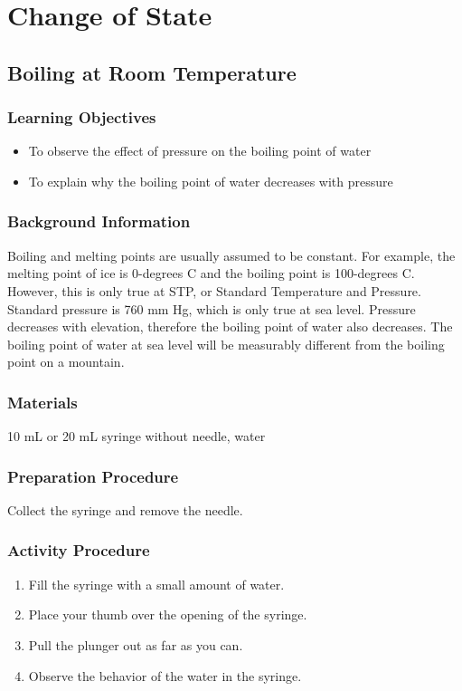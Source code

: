 \section{Change of State}

\subsection{Boiling at Room Temperature}

\subsubsection*{Learning Objectives}
\begin{itemize}
\item{To observe the effect of pressure on the boiling point of water} 
\item{To explain why the boiling point of water decreases with pressure} 
\end{itemize}

\subsubsection*{Background Information}
Boiling and melting points are usually assumed to be constant. For example, the melting point of ice is 0-degrees C and the boiling point is 100-degrees C. However, this is only true at STP, or Standard Temperature and Pressure. Standard pressure is 760 mm Hg, which is only true at sea level. Pressure decreases with elevation, therefore the boiling point of water also decreases. The boiling point of water at sea level will be measurably different from the boiling point on a mountain.  

\subsubsection*{Materials}
10 mL or 20 mL syringe without needle, water

\subsubsection*{Preparation Procedure}
Collect the syringe and remove the needle.

\subsubsection*{Activity Procedure}
\begin{enumerate}
\item{Fill the syringe with a small amount of water.} 
\item{Place your thumb over the opening of the syringe.} 
\item{Pull the plunger out as far as you can.} 
\item{Observe the behavior of the water in the syringe.} 
\end{enumerate}

